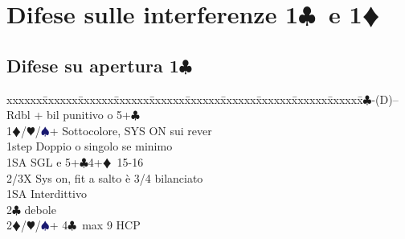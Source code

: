 \documentclass[a4paper,italian]{article}
\newcommand{\BC}{\textcolor{OliveGreen}{$\clubsuit$}}
\newcommand{\BD}{\textcolor{RedOrange}{$\vardiamondsuit$}}
\newcommand{\BH}{\textcolor{Red2}{$\varheartsuit${}}}
\newcommand{\BS}{\textcolor{MidnightBlue}{$\spadesuit${}}}
\newcommand{\pdfc}{\texorpdfstring{\BC{}}{C}}
\newcommand{\pdfd}{\texorpdfstring{\BD{}}{D}}
\newenvironment{bidtable}
{\begin{tabbing}

    xxxxxx\=xxxxxx\=xxxxxx\=xxxxxx\=xxxxxx\=xxxxxx\=xxxxxx\=xxxxxx\=xxxxxx\=xxxxxx\=\kill}
{\end{tabbing} }%
\begin{document}
                                    \newpage
                                    \section{Difese sulle interferenze 1\pdfc\ e 1\pdfd}

                                    \begin{multicols}{2}
                                        \subsection{Difese su apertura 1\pdfc}

                                        \begin{bidtable}
                                            1\BC-(D)--\+\\
                                            Rdbl + bil punitivo o 5+\BC \\
                                            1\BD/\BH/\BS {}+ Sottocolore, SYS ON sui rever\+\\
                                            1step \> Doppio o singolo se minimo\\
                                            1SA \> SGL e 5+\BC 4+\BD\ 15-16\\
                                            2/3X \> Sys on, fit a salto è 3/4 bilanciato\-\\
                                            1SA \> Interdittivo\\
                                            2\BC \> debole\\
                                            2\BD/\BH/\BS {}+ 4\BC\ max 9 HCP\-
                                        \end{bidtable}


\end{multicols}
\end{document}
